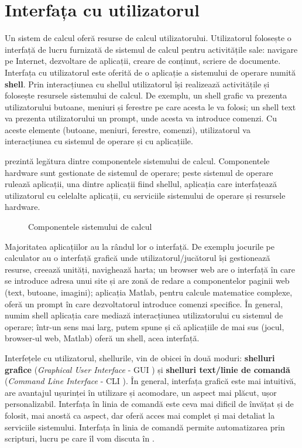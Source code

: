 \chapter{Interfața cu utilizatorul}
\label{ch:ui}

Un sistem de calcul oferă resurse de calcul utilizatorului.
Utilizatorul folosește o interfață de lucru furnizată de sistemul de calcul pentru activitățile sale: navigare pe Internet, dezvoltare de aplicații, creare de conținut, scriere de documente.
Interfața cu utilizatorul este oferită de o aplicație a sistemului de operare numită \textbf{shell}.
Prin interacțiunea cu shellul utilizatorul își realizează activitățile și folosește resursele sistemului de calcul.
De exemplu, un shell grafic va prezenta utilizatorului butoane, meniuri și ferestre pe care acesta le va folosi;
un shell text va prezenta utilizatorului un prompt, unde acesta va introduce comenzi.
Cu aceste elemente (butoane, meniuri, ferestre, comenzi), utilizatorul va interacțiunea cu sistemul de operare și cu aplicațiile.

 prezintă legătura dintre componentele sistemului de calcul.
Componentele hardware sunt gestionate de sistemul de operare;
peste sistemul de operare rulează aplicații, una dintre aplicații fiind shellul, aplicația care interfațează utilizatorul cu celelalte aplicații, cu serviciile sistemului de operare și resursele hardware.

\begin{figure}[htbp]
  \centering
  \def\svgwidth{\columnwidth}
  
  \caption{Componentele sistemului de calcul}
  \label{fig:ui:system-components}
\end{figure}

Majoritatea aplicațiilor au la rândul lor o interfață.
De exemplu jocurile pe calculator au o interfață grafică unde utilizatorul/jucătorul își gestionează resurse, creează unități, navighează harta;
un browser web are o interfață în care se introduce adresa unui site și are zonă de redare a componentelor paginii web (text, butoane, imagini);
aplicația Matlab, pentru calcule matematice complexe, oferă un prompt în care dezvoltatorul introduce comenzi specifice.
În general, numim shell aplicația care mediază interacțiunea utilizatorului cu sistemul de operare;
într-un sens mai larg, putem spune și că aplicațiile de mai sus (jocul, browser-ul web, Matlab) oferă un shell, acea interfață.

Interfețele cu utilizatorul, shellurile, vin de obicei în două moduri: \textbf{shelluri grafice} (\textit{Graphical User Interface} - GUI ) și \textbf{shelluri text/linie de comandă} (\textit{Command Line Interface} - CLI ).
În general, interfața grafică este mai intuitivă, are avantajul ușurinței în utilizare și acomodare, un aspect mai plăcut, ușor personalizabil.
Interfața în linia de comandă este ceva mai dificil de învățat și de folosit, mai anostă ca aspect, dar oferă acces mai complet și mai detaliat la serviciile sistemului.
Interfața în linia de comandă permite automatizarea prin scripturi, lucru pe care îl vom discuta în .

